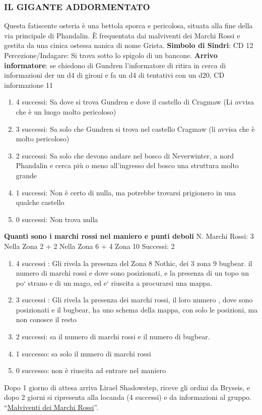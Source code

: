 \documentclass{article}
\begin{document}
\subsubsection{IL GIGANTE ADDORMENTATO}Questa fatiscente osteria è una bettola sporca e pericolosa,
situata alla fine della via principale di Phandalin. È
frequentata dai malviventi dei Marchi Rossi e gestita da
una cinica ostessa nanica di nome Grista.
\textbf{Simbolo di Sindri}: CD 12 Percezione/Indagare: Si trova sotto lo spigolo di un bancone. 
\textbf{Arrivo informatore}: se chiedono di Gundren l'informatore di ritira in cerca di informazioni der un d4 di gironi e fa un d4 di tentativi con un d20, CD informazione 11 \begin{enumerate}
    \item 4 successi: Sa dove si trova Gundren e dove il castello di Cragmaw (Li avvisa che è un luogo molto pericoloso)
    \item 3 successi: Sa solo che Gundren si trova nel castello Cragmaw (li avvisa che è molto pericoloso)
    \item 2 successi: Sa solo che devono andare nel bosco di Neverwinter, a nord Phandalin e cerca più o meno all'ingresso del bosco una struttura molto grande
    \item 1 successi: Non è certo di nulla, ma potrebbe trovarsi prigionero in una qualche castello
    \item 0 successi: Non trova nulla
\end{enumerate}
  \textbf{Quanti sono i marchi rossi nel maniero e punti deboli}
  N. Marchi Rossi: 3 Nella Zona 2 + 2 Nella Zona 6 +  4 Zona 10
  Successi: 2
     \begin{enumerate} 
         \item 4 successi : Gli rivela la presenza del Zona 8 Nothic, dei 3 zona 9 bugbear. il numero di marchi rossi e dove sono posizionati, e la presenza di un topo un po` strano e di un mago, ed e` riuscita a procurarsi una mappa. 
         \item 3 successi : Gli rivela la presenza dei marchi rossi, il loro numero , dove sono posizionati e il bugbear, ha uno schema della mappa, con solo le posizioni, ma non conosce il resto 
         \item 2 successi: sa il numero di marchi rossi e il numero di bugbear.
         \item 1 successo: sa solo il numero di marchi rossi
         \item 0 successo: non è riuscita ad entrare nel maniero
     \end{enumerate}
Dopo 1 giorno di attesa arriva Lirael Shadowstep, riceve gli ordini da Bryseis, e dopo 2 giorni si ripresenta alla locanda (4 successi) e da informazioni al gruppo. 
“\hyperlink{incontro}{Malviventi dei Marchi Rossi}”.
\end{document}
